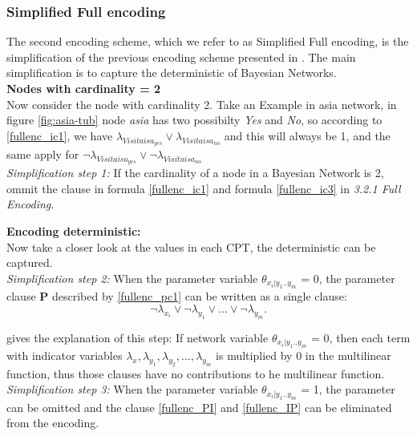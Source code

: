         \subsubsection{Simplified Full encoding}
        The second encoding scheme, which we refer to as Simplified Full encoding, is the simplification of the previous encoding scheme presented in \cite{enc1}. The main simplification is to capture the deterministic of Bayesian Networks.\\
        
        \noindent \textbf{Nodes with cardinality = 2}\\
        Now consider the node with cardinality 2. Take an Example in asia network, in figure \ref{fig:asia-tub} node \textit{asia} has two possibilty \textit{Yes} and \textit{No}, so according to \ref{fullenc_ic1}, we have $\lambda_{Visitaisa_{yes}} \vee \lambda_{Visitaisa_{no}}$ and this will always be 1, and the same apply for $\neg\lambda_{Visitaisa_{yes}} \vee \neg\lambda_{Visitaisa_{no}}$ \\
        \newline
        \noindent \textit{Simplification step 1:} If the cardinality of a node in a Bayesian Network is 2, ommit the clause in formula \ref{fullenc_ic1} and formula \ref{fullenc_ic3} in \textit{3.2.1 Full Encoding}.
        \newline
        
        \noindent \textbf{Encoding deterministic:}\\
        Now take a closer look at the values in each CPT, the deterministic can be captured.\\
        
        \noindent \textit{Simplification step 2:} When the parameter variable $\theta_{x_{i}|y_{1}..y_{m}}$ = 0, the parameter clause \textbf{P} described by \ref{fullenc_pc1} can be written as a single clause: $$\neg\lambda_{x_{i}} \vee \neg\lambda_{y_{1}} \vee... \vee \neg\lambda_{y_{m}}.$$
        
        \noindent \cite{enc1} gives the explanation of this step: If network variable $\theta_{x_{i}|y_{1}..y_{m}}$ = 0, then each term with indicator variables $\lambda_{x}, \lambda_{y_{1}}, \lambda_{y_{2}}, ..., \lambda_{y_{m}}$ is multiplied by 0 in the multi\-linear function, thus those clauses have no contributions to he multi\-linear function.\\
        \newline
        \noindent \textit{Simplification step 3:} When the parameter variable $\theta_{x_{i}|y_{1}..y_{m}}$ = 1, the parameter can be omitted and the clause \ref{fullenc_PI} and \ref{fullenc_IP} can be eliminated from the encoding.\\
        

